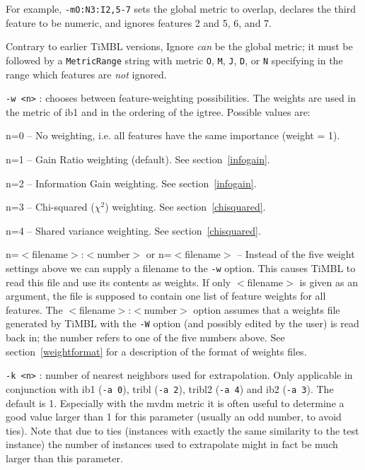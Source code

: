 \documentclass{report}
\begin{document}
\begin{description}
For example, {\tt -mO:N3:I2,5-7} sets the global metric to overlap,
declares the third feature to be numeric, and ignores features 2 and
5, 6, and 7.

Contrary to earlier TiMBL versions, Ignore {\em can}\/ be the global
metric; it must be followed by a {\tt MetricRange} string with metric
{\tt O}, {\tt M}, {\tt J}, {\tt D}, or {\tt N} specifying in the range which
features are {\em not}\/ ignored.

\item {\tt -w <n>} : chooses between feature-weighting possibilities.
The weights are used in the metric of {\sc ib1} and in the ordering of the
{\sc igtree}. Possible values are:

	\begin{description}
	\item n=0 -- No weighting, i.e. all features have the same
	importance (weight = 1).
	\item n=1 -- Gain Ratio weighting (default). See section~\ref{infogain}.
	\item n=2 -- Information Gain weighting. See section~\ref{infogain}.
	\item n=3 -- Chi-squared ($\chi^2$) weighting. See section~\ref{chisquared}.
	\item n=4 -- Shared variance weighting. See section~\ref{chisquared}.
	\item n=$<$filename$>$:$<$number$>$ or n=$<$filename$>$ --
          Instead of the five weight settings above we can supply a
          filename to the {\tt -w} option. This causes TiMBL to read
          this file and use its contents as weights. If only
          $<$filename$>$ is given as an argument, the file is supposed
          to contain one list of feature weights for all features. The
          $<$filename$>$:$<$number$>$ option assumes that a weights
          file generated by TiMBL with the {\tt -W} option (and
          possibly edited by the user) is read back in; the number
          refers to one of the five numbers above. See
          section~\ref{weightformat} for a description of the format
          of weights files.
	\end{description}

\item {\tt -k <n>} : number of nearest neighbors used for
extrapolation. Only applicable in conjunction with {\sc ib1} ({\tt -a
0}), {\sc tribl} ({\tt -a 2}), {\sc tribl2} ({\tt -a 4}) and {\sc ib2}
({\tt -a 3}). The default is 1. Especially with the {\sc mvdm} metric
it is often useful to determine a good value larger than 1 for this
parameter (usually an odd number, to avoid ties). Note that due to
ties (instances with exactly the same similarity to the test instance)
the number of instances used to extrapolate might in fact be much
larger than this parameter.


\end{description}
\end{document}
